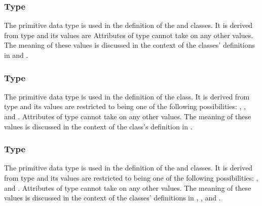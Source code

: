 \subsubsection{Type \fixttspace{}}
\label{primtype-DataKind}

The  primitive data type is used in the definition of the \SampledField and \ParametricGeometry classes.  It is derived from type  and its values are   Attributes of type  cannot take on any other values.  The meaning of these values is discussed in the context of the classes' definitions in  and .


\subsubsection{Type \fixttspace{}}
\label{primtype-DiffusionKind}

The  primitive data type is used in the definition of the \DiffusionCoefficient class.  It is derived from type  and its values are restricted to being one of the following possibilities: , , and .  Attributes of type  cannot take on any other values.  The meaning of these values is discussed in the context of the \DiffusionCoefficient class's definition in .


\subsubsection{Type \fixttspace{}}
\label{primtype-CompressionKind}

The  primitive data type is used in the definition of the \SampledField and \ParametricObject classes.  It is derived from type  and its values are restricted to being one of the following possibilities: , and .  Attributes of type  cannot take on any other values.  The meaning of these values is discussed in the context of the classes' definitions in , , and .


